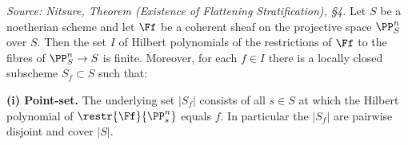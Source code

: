 \begin{theorem}
  \label{thm:flattening-stratification}
  \textit{Source: Nitsure, Theorem (Existence of Flattening Stratification), §4.}
  Let \(S\) be a noetherian scheme and let \(\Ff\) be a coherent sheaf on the
  projective space \(\PP^n_S\) over \(S\). Then the set \(I\) of Hilbert
  polynomials of the restrictions of \(\Ff\) to the fibres of \(\PP^n_S\to S\) is
  finite. Moreover, for each \(f\in I\) there is a locally closed subscheme
  \(S_f\subset S\) such that:

  \textbf{(i) Point-set.} The underlying set \(|S_f|\) consists of all \(s\in S\)
  at which the Hilbert polynomial of \(\restr{\Ff}{\PP^n_s}\) equals \(f\). In
  particular the \(|S_f|\) are pairwise disjoint and cover \(|S|\).


\end{theorem}
